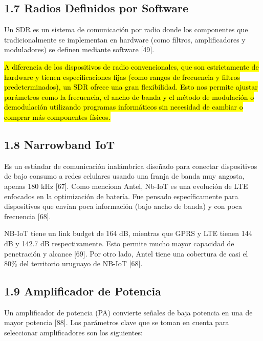 \documentclass[12pt,a4paper]{article}
\begin{document}
\subsection{1.7 Radios Definidos por Software}\label{radios-definidos-por-software}

Un SDR es un sistema de comunicación por radio donde los componentes que tradicionalmente se implementan en hardware (como filtros, amplificadores y moduladores) se definen mediante software {[}49{]}.

\hl{A diferencia de los dispositivos de radio convencionales, que son estrictamente de hardware y tienen especificaciones fijas (como rangos de frecuencia y filtros predeterminados), un SDR ofrece una gran flexibilidad. Esto nos permite ajustar parámetros como la frecuencia, el ancho de banda y el método de modulación o demodulación utilizando programas informáticos sin necesidad de cambiar o comprar más componentes físicos.}

\subsection{1.8 Narrowband IoT}\label{narrowband-iot}

Es un estándar de comunicación inalámbrica diseñado para conectar dispositivos de bajo consumo a redes celulares usando una franja de banda muy angosta, apenas 180 kHz {[}67{]}. Como menciona Antel, Nb-IoT es una evolución de LTE enfocados en la optimización de batería. Fue pensado específicamente para dispositivos que envían poca información (bajo ancho de banda) y con poca frecuencia {[}68{]}.

NB-IoT tiene un link budget de 164 dB, mientras que GPRS y LTE tienen 144 dB y 142.7 dB respectivamente. Esto permite mucho mayor capacidad de penetración y alcance {[}69{]}. Por otro lado, Antel tiene una cobertura de casi el 80\% del territorio uruguayo de NB-IoT {[}68{]}.

\subsection{1.9 Amplificador de Potencia}\label{amplificador-de-potencia}

Un amplificador de potencia (PA) convierte señales de baja potencia en una de mayor potencia {[}88{]}. Los parámetros clave que se toman en cuenta para seleccionar amplificadores son los siguientes:
\end{document}
